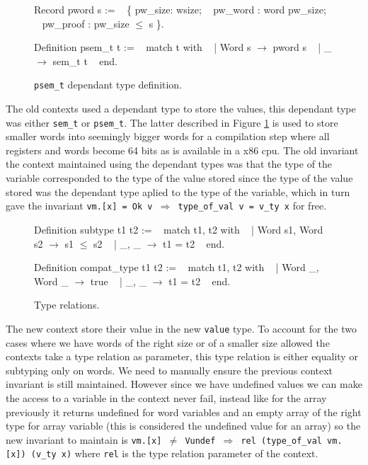 \documentclass{article}
\begin{document}
\medskip

\begin{figure}
\obeylines\obeyspaces\ttfamily%
Record pword s :=
~ \{ pw\_size: wsize;
~   pw\_word : word pw\_size;
~   pw\_proof : pw\_size \(\leq\) s \}.

Definition psem\_t t :=
~ match t with
~ | Word s \(\rightarrow\) pword s
~ | \_      \(\rightarrow\) sem\_t t
~ end.
\normalfont%
\caption{\texttt{psem\_t} dependant type definition.}\label{fig:psemt}
\end{figure}

The old contexts used a dependant type to store the values, this dependant type
was either \texttt{sem\_t} or \texttt{psem\_t}. The latter described in Figure
\ref{fig:psemt} is used to store smaller words into seemingly bigger words for
a compilation step where all registers and words become 64 bits as is available
in a x86 cpu. The old invariant the context maintained using the dependant types
was that the type of the variable corresponded to the type of the value stored
since the type of the value stored was the dependant type aplied to the type of
the variable, which in turn gave the invariant
\texttt{vm.[x] = Ok v \(\Longrightarrow\) type\_of\_val v = v\_ty x} for free.

\begin{figure}[t]
\obeylines\obeyspaces\ttfamily%
Definition subtype t1 t2 :=
~ match t1, t2 with
~ | Word s1, Word s2 \(\rightarrow\) s1 \(\leq\) s2
~ | \_,       \_       \(\rightarrow\) t1 = t2
~ end.

Definition compat\_type t1 t2 :=
~ match t1, t2 with
~ | Word \_, Word \_ \(\rightarrow\) true
~ | \_,      \_      \(\rightarrow\) t1 = t2
~ end.
\normalfont%
\caption{Type relations.}
\end{figure}

The new context store their value in the new \texttt{value} type. To account for
the two cases where we have words of the right size or of a smaller size allowed
the contexts take a type relation as parameter, this type relation is either
equality or subtyping only on words. We need to manually ensure the previous
context invariant is still maintained. However since we have undefined values we
can make the access to a variable in the context never fail, instead like for
the array previously it returns undefined for word variables and an empty array
of the right type for array variable (this is considered the undefined value for
an array) so the new invariant to maintain is
\texttt{vm.[x] \(\neq\) Vundef \(\Longrightarrow\) rel (type\_of\_val vm.[x]) (v\_ty x)}
where \texttt{rel} is the type relation parameter of the context.
\end{document}
